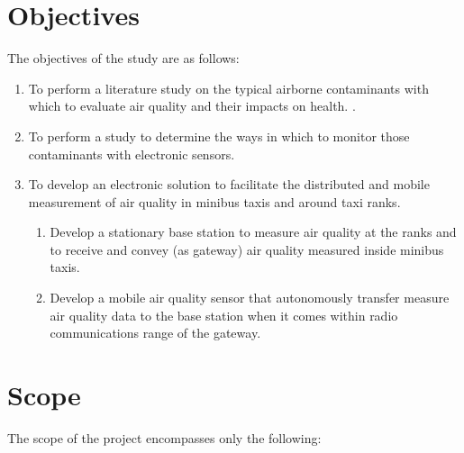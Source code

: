 \section{Objectives}
The objectives of the study are as follows:
\begin{enumerate}
	\item To perform a literature study on the typical  airborne contaminants with which to evaluate air quality and their impacts on health. .
	\item To perform a study to determine the ways in which to monitor those contaminants with electronic sensors. 
	\item To develop an electronic solution to facilitate the distributed and mobile measurement of air quality in minibus taxis and around taxi ranks. 
          \begin{enumerate}
	           \item Develop a stationary base station to measure air quality at the ranks and to receive and convey (as gateway) air quality measured inside minibus taxis. 
              \item Develop a mobile air quality sensor that autonomously transfer measure air quality data to the base station when it comes within radio communications range of the gateway.
	       \end{enumerate} 
\end{enumerate}




\section{Scope}
The scope of the project encompasses only the following:

